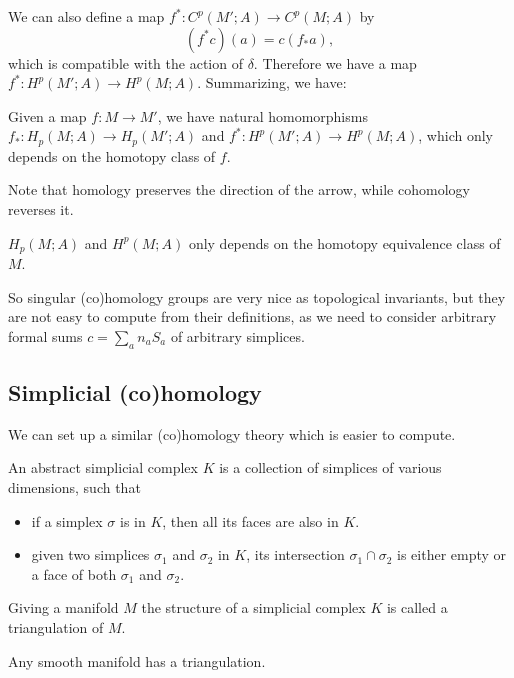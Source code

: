 \documentclass[12pt]{article}
\numberwithin{equation}{section}
\numberwithin{figure}{section}
\theoremstyle{remark}
\begin{document}
We can also define a map $f^*:C^p(M';A)\to C^p(M;A)$ by \begin{equation}
(f^*c)(a) = c(f_*a),
\end{equation} which is compatible with the action of $\delta$.
Therefore we have a map $f^*: H^p(M';A)\to H^p(M;A)$.
Summarizing, we have:
\begin{proposition}
Given a map $f:M\to M'$, we have natural homomorphisms 
 $f_*: H_p(M;A)\to H_p(M';A)$ and $f^*: H^p(M';A)\to H^p(M;A)$,
 which only depends on the homotopy class of $f$.
\end{proposition}

Note that homology preserves the direction of the arrow, while cohomology reverses it.

\begin{corollary}
  $H_p(M;A)$ and $H^p(M;A)$ only depends on the homotopy equivalence class of $M$.
\end{corollary}

So singular (co)homology groups are very nice as topological invariants,
but they are not easy to compute from their definitions,
as we need to consider arbitrary formal sums $c=\sum_a n_a S_a$ of arbitrary simplices.

\subsection{Simplicial (co)homology}
We can set up a similar (co)homology theory which is easier to compute.

\begin{definition}
  \label{def:simplicial}
An abstract simplicial complex $K$ is a collection of simplices of various dimensions, such that \begin{itemize}
\item if a simplex $\sigma$ is in $K$, then all its faces are also in $K$.
\item given two simplices $\sigma_1$ and $\sigma_2$ in $K$, its intersection $\sigma_1\cap \sigma_2$ is either empty or a face of both $\sigma_1$ and $\sigma_2$. 
\end{itemize}
\end{definition}



\begin{definition}
Giving a manifold $M$ the structure of a simplicial complex $K$ is called a triangulation of $M$.
\end{definition}

\begin{proposition}
  Any smooth manifold has a triangulation.
\end{proposition}
\end{document}
